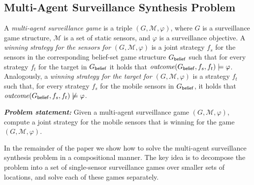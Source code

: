 \subsection{Multi-Agent Surveillance Synthesis Problem}
A \emph{multi-agent surveillance game} is a triple $(G,\mathcal M,\varphi)$, where $G$ is a surveillance game structure, $\mathcal M$ is a set of static sensors,  and $\varphi$ is a surveillance objective. A \emph{winning strategy for the sensors for $(G,\mathcal M,\varphi)$} is a joint strategy $f_s$ for the sensors in the corresponding belief-set game structure $G_{\mathsf{belief}}$ such that for every strategy $f_t$ for the target in $G_{\mathsf{belief}}$ it holds that $\mathit{outcome}(G_{\mathsf{belief}},f_s,f_t) \models \varphi$. Analogously, a \emph{winning strategy for the target for $(G,\mathcal M,\varphi)$} is a strategy $f_t$ such that, for every strategy $f_s$ for the mobile sensors in $G_{\mathsf{belief}}$, it holds that $\mathit{outcome}(G_{\mathsf{belief}},f_s,f_t) \not\models \varphi$.

{\textit{\textbf{Problem statement: }}} Given a multi-agent surveillance game $(G,\mathcal M,\varphi)$,  compute a joint strategy for the mobile sensors that is winning for the game $(G,\mathcal M,\varphi)$.

In the remainder of the paper we show how to solve the multi-agent surveillance synthesis problem in a compositional manner.  The key idea is to decompose the problem into a set of single-sensor surveillance games over smaller sets of locations, and solve each of these games separately. 

